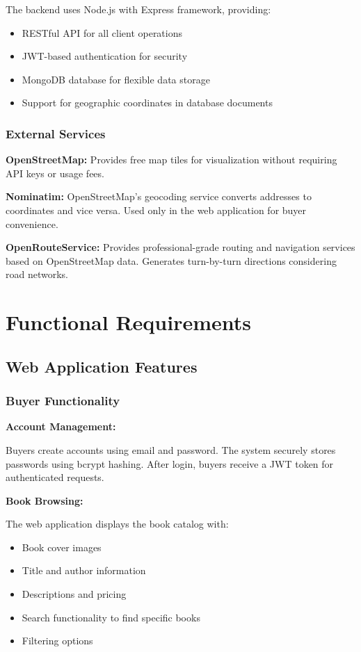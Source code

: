 \documentclass[12pt,a4paper]{article}
\begin{document}
The backend uses Node.js with Express framework, providing:
\begin{itemize}
    \item RESTful API for all client operations
    \item JWT-based authentication for security
    \item MongoDB database for flexible data storage
    \item Support for geographic coordinates in database documents
\end{itemize}

\subsubsection{External Services}

\textbf{OpenStreetMap:} Provides free map tiles for visualization without requiring API keys or usage fees.

\textbf{Nominatim:} OpenStreetMap's geocoding service converts addresses to coordinates and vice versa. Used only in the web application for buyer convenience.

\textbf{OpenRouteService:} Provides professional-grade routing and navigation services based on OpenStreetMap data. Generates turn-by-turn directions considering road networks.

\newpage

\section{Functional Requirements}

\subsection{Web Application Features}

\subsubsection{Buyer Functionality}

\textbf{Account Management:}

Buyers create accounts using email and password. The system securely stores passwords using bcrypt hashing. After login, buyers receive a JWT token for authenticated requests.

\textbf{Book Browsing:}

The web application displays the book catalog with:
\begin{itemize}
    \item Book cover images
    \item Title and author information
    \item Descriptions and pricing
    \item Search functionality to find specific books
    \item Filtering options
\end{itemize}
\end{document}
